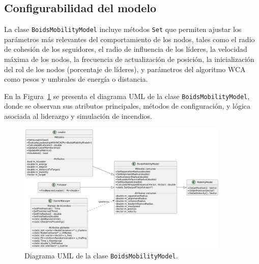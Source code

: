 \documentclass{article}
\begin{document}
\subsection{Configurabilidad del modelo}

La clase \texttt{BoidsMobilityModel} incluye métodos \texttt{Set} que permiten ajustar los parámetros más relevantes del comportamiento de los nodos, tales como el radio de cohesión de los seguidores, el radio de influencia de los líderes, la velocidad máxima de los nodos, la frecuencia de actualización de posición, la inicialización del rol de los nodos (porcentaje de líderes), y parámetros del algoritmo WCA como pesos y umbrales de energía o distancia.

En la Figura~\ref{fig:uml-boids} se presenta el diagrama UML de la clase \texttt{BoidsMobilityModel}, donde se observan sus atributos principales, métodos de configuración, y lógica asociada al liderazgo y simulación de incendios.

\begin{figure}[H]
    \centering
    \includegraphics[width=0.9\textwidth]{class_diagram.png}
    \caption{Diagrama UML de la clase \texttt{BoidsMobilityModel}.}
    \label{fig:uml-boids}
\end{figure}
\end{document}
